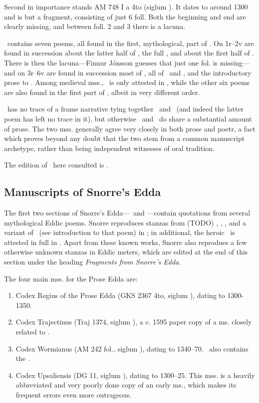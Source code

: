 Second in importance stands AM 748 I a 4to (siglum \AM).  It dates to around 1300 and is but a fragment, consisting of just 6 foll.  Both the beginning and end are clearly missing, and between foll. 2 and 3 there is a lacuna.

\AM\ contains seven poems, all found in the first, mythological, part of \Regius.  On 1r–2v are found in succession about the latter half of \Harbardsljod, the full \Baldrsdraumar, and about the first half of \Skirnismal.  There is then the lacuna—Finnur Jónsson guesses that just one fol. is missing—and on 3r–6v are found in succession most of \Vafthrudnismal, all of \Grimnismal\ and \Hymiskvida, and the introductory prose to \Volundarkvida.  Among medieval mss., \Baldrsdraumar\ is only attested in \AM, while the other six poems are also found in the first part of \Regius, albeit in very different order.

\AM\ has no trace of a frame narrative tying together \Hymiskvida\ and \Lokasenna\ (and indeed the latter poem has left no trace in it), but otherwise \AM\ and \Regius\ do share a substantial amount of prose.  The two mss. generally agree very closely in both prose and poetr, a fact which proves beyond any doubt that the two stem from a common manuscript archetype, rather than being independent witnesses of oral tradition.

The edition of \AM\ here consulted is \textcite{Finnur1896}.

\subsection{Manuscripts of Snorre’s Edda}

The first two sections of Snorre’s Edda—\Gylfaginning\ and \Skaldskaparmal—contain quotations from several mythological Eddic poems.  Snorre reproduces stanzas from (TODO) \Voluspa, \Vafthrudnismal, \Grimnismal, and a variant of \Lokasenna\ (see introduction to that poem) in \Gylfaginning; in additional, the heroic \Grottasongr\ is attested in full in \Skaldskaparmal.  Apart from these known works, Snorre also reprodues a few otherwise unknown stanzas in Eddic meters, which are edited at the end of this section under the heading \emph{Fragments from Snorre’s Edda}.

The four main mss. for the Prose Edda are:%

\begin{enumerate}
  \item Codex Regius of the Prose Edda (GKS 2367 4to, siglum \RegiusProse), dating to 1300-1350.
  \item Codex Trajectinus (Traj 1374, siglum \Trajectinus), a c. 1595 paper copy of a ms. closely related to \RegiusProse.
  \item Codex Wormianus (AM 242 fol., siglum \Wormianus), dating to 1340–70. \Wormianus\ also contains the \Rigsthula.
  \item Codex Upsaliensis (DG 11, siglum \Upsaliensis), dating to 1300–25.  This mss. is a heavily abbreviated and very poorly done copy of an early ms., which makes its frequent errors even more outrageous.
\end{enumerate}

